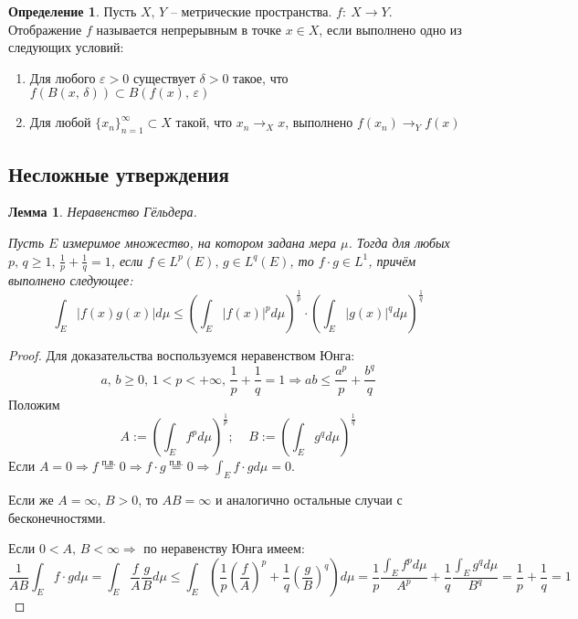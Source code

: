 \documentclass[a4paper,12pt]{article}
\renewcommand{\leq}{\ensuremath{\leqslant}}
\renewcommand{\geq}{\ensuremath{\geqslant}}
\theoremstyle{plain}
\newtheorem{lemma}{Лемма}[section]
\theoremstyle{definition}
\newtheorem{definition}{Определение}[section]
\theoremstyle{remark}
\begin{document}
\begin{definition}
	Пусть $X,\, Y$ -- метрические пространства. $f :\: X \to Y$. Отображение $f$ называется непрерывным в точке $x \in X$, если выполнено одно из следующих условий:
	\begin{enumerate}
		\item Для любого $\varepsilon > 0$ существует $\delta > 0$ такое, что $f(B(x,\, \delta)) \subset B(f(x),\, \varepsilon)$
		\item Для любой $\{x_n\}_{n = 1}^\infty \subset X$ такой, что $x_n \to_X x$, выполнено $f(x_n) \to_Y f(x)$
	\end{enumerate}
\end{definition}

\subsection{Несложные утверждения}

\begin{lemma}
	Неравенство Гёльдера.

	Пусть $E$ измеримое множество, на котором задана мера $\mu$. Тогда для любых $p,\,q \geq 1,\, \frac{1}{p} + \frac{1}{q} = 1$, если $f \in L^p(E),\, g \in L^q(E)$, то $f \cdot g \in L^1$, причём выполнено следующее:
	\[
		\int_E \vert f(x)g(x) \vert d\mu \leq \left(\int_E \vert f(x)\vert^p d\mu\right)^{\frac{1}{p}} \cdot \left(\int_E \vert g(x) \vert^q d\mu\right)^{\frac{1}{q}}
	\]
\end{lemma}

\begin{proof}
	Для доказательства воспользуемся неравенством Юнга:
	\[
		a,\,b \geq 0,\, 1 < p < +\infty,\, \frac{1}{p} + \frac{1}{q} = 1 \Rightarrow ab \leq \frac{a^p}{p} + \frac{b^q}{q}
	\]
	Положим
	\[
		A := \left(\int_Ef^pd\mu\right)^{\frac{1}{p}} ;\;\;\;\; B := \left(\int_Eg^qd\mu\right)^{\frac{1}{q}}
	\]
	Если $A = 0 \Rightarrow f \overset{\text{п.в.}}{=} 0 \Rightarrow f\cdot g  \overset{\text{п.в.}}{=} 0 \Rightarrow \int_Ef\cdot gd\mu = 0$.

	Если же $A = \infty,\, B > 0$, то $AB = \infty$ и аналогично остальные случаи с бесконечностями.

	Если $0 < A,\, B < \infty \Rightarrow$ по неравенству Юнга имеем:
	\[
		\frac{1}{AB}\int_Ef\cdot gd\mu = \int_E\frac{f}{A}\frac{g}{B}d\mu \leq \int_E \left(\frac{1}{p}\left(\frac{f}{A}\right)^p + \frac{1}{q}\left(\frac{g}{B}\right)^q\right)d\mu = \frac{1}{p}\frac{\int_Ef^pd\mu}{A^p} + \frac{1}{q}\frac{\int_Eg^qd\mu}{B^q} = \frac{1}{p} + \frac{1}{q} = 1
	\]
\end{proof}
\end{document}
